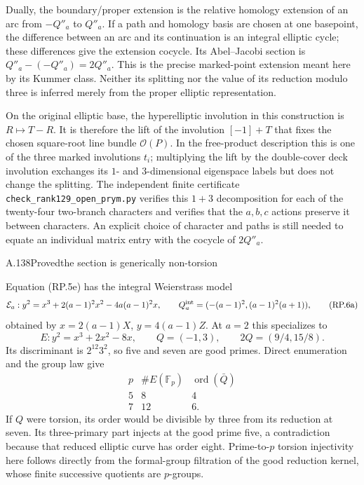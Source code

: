 Dually, the boundary/proper extension is the
relative homology extension of an arc from
$-Q''_a$ to $Q''_a$. If a path and homology basis
are chosen at one basepoint, the difference
between an arc and its continuation is an
integral elliptic cycle; these differences give
the extension cocycle. Its Abel--Jacobi section
is $Q''_a-(-Q''_a)=2Q''_a$. This is the precise
marked-point extension meant here by its Kummer
class. Neither its splitting nor the value of
its reduction modulo three is inferred merely
from the proper elliptic representation.

On the original elliptic base, the hyperelliptic
involution in this construction is $R\mapsto T-R$.
It is therefore the lift of the involution
$[-1]+T$ that fixes the chosen square-root line
bundle $\mathcal O(P)$. In the free-product
description this is one of the three marked
involutions $t_i$; multiplying the lift by the
double-cover deck involution exchanges its
$1$- and $3$-dimensional eigenspace labels but
does not change the splitting. The independent
finite certificate
\texttt{check\_rank129\_open\_prym.py} verifies
this $1+3$ decomposition for each of the twenty-four
two-branch characters and verifies that the
$a,b,c$ actions preserve it between characters.
An explicit choice of character and paths is
still needed to equate an individual matrix
entry with the cocycle of $2Q''_a$.

\begin{statement}{A.138}{Proved}{the section is generically non-torsion}
\end{statement}
Equation (RP.5e) has the integral Weierstrass model
\[
 \mathcal E_a:
 y^2=x^3+2(a-1)^2x^2-4a(a-1)^2x,
 \qquad
 Q_a^{\rm int}=(-(a-1)^2,(a-1)^2(a+1)),
 \tag{RP.6a}
\]
obtained by $x=2(a-1)X$, $y=4(a-1)Z$.
At $a=2$ this specializes to
\[
 E:y^2=x^3+2x^2-8x,\qquad Q=(-1,3),\qquad
                    2Q=(9/4,15/8).
\]
Its discriminant is $2^{12}3^2$, so five and seven
are good primes. Direct enumeration and the group
law give
\[
\begin{array}{c|cc}
 p&\#E(\mathbb F_p)&\operatorname{ord}(\bar Q)\\ \hline
 5&8&4\\
 7&12&6.
\end{array}
 \tag{RP.6b}
\]
If $Q$ were torsion, its order would be divisible
by three from its reduction at seven. Its
three-primary part injects at the good prime
five, a contradiction because that reduced
elliptic curve has order eight. Prime-to-$p$
torsion injectivity here follows directly from
the formal-group filtration of the good
reduction kernel, whose finite successive
quotients are $p$-groups.


